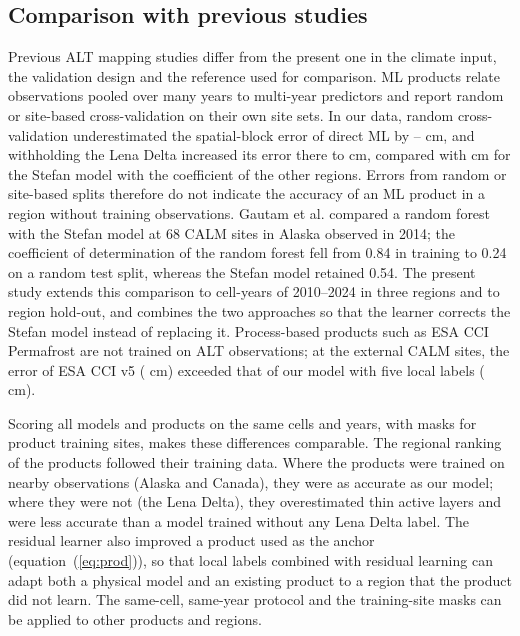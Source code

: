 \subsection{Comparison with previous studies}
Previous ALT mapping studies differ from the present one in the climate input, the validation design and the reference used for comparison. ML products relate observations pooled over many years to multi-year predictors and report random or site-based cross-validation on their own site sets\cite{Ran2022a,Liu2024,Wei2026}. In our data, random cross-validation underestimated the spatial-block error of direct ML by \noptimLeDz--\noptimCaDz{} cm, and withholding the Lena Delta increased its error there to \nrmseLeregDz{} cm, compared with \nrmseLeregPz{} cm for the Stefan model with the coefficient of the other regions. Errors from random or site-based splits therefore do not indicate the accuracy of an ML product in a region without training observations. Gautam et al.\cite{Gautam2025} compared a random forest with the Stefan model at 68 CALM sites in Alaska observed in 2014; the coefficient of determination of the random forest fell from 0.84 in training to 0.24 on a random test split, whereas the Stefan model retained 0.54. The present study extends this comparison to cell-years of 2010--2024 in three regions and to region hold-out, and combines the two approaches so that the learner corrects the Stefan model instead of replacing it. Process-based products such as ESA CCI Permafrost are not trained on ALT observations\cite{Westermann2024,Westermann2025}; at the external CALM sites, the error of ESA CCI v5 (\nftAllCcifivezero{} cm) exceeded that of our model with five local labels (\nftAllRsfive{} cm).

Scoring all models and products on the same cells and years, with masks for product training sites, makes these differences comparable. The regional ranking of the products followed their training data. Where the products were trained on nearby observations (Alaska and Canada), they were as accurate as our model; where they were not (the Lena Delta), they overestimated thin active layers and were less accurate than a model trained without any Lena Delta label. The residual learner also improved a product used as the anchor (equation~(\ref{eq:prod})), so that local labels combined with residual learning can adapt both a physical model and an existing product to a region that the product did not learn. The same-cell, same-year protocol and the training-site masks can be applied to other products and regions.

